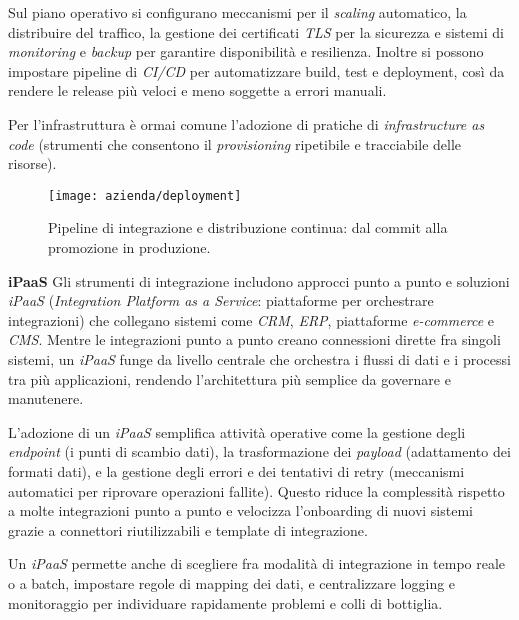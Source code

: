Sul piano operativo si configurano meccanismi per il \emph{scaling} automatico, la distribuire del traffico, 
la gestione dei certificati \emph{TLS} per la sicurezza e sistemi di \emph{monitoring} e \emph{backup} per garantire disponibilità e resilienza. 
Inoltre si possono impostare pipeline di \emph{CI/CD} per automatizzare build, test e deployment, così da rendere le release più veloci e meno soggette a errori manuali.

Per l’infrastruttura è ormai comune l’adozione di pratiche di \emph{infrastructure as code} (strumenti che consentono il \emph{provisioning} ripetibile e tracciabile delle risorse). 

\begin{figure}[htbp]
    \centering
    \texttt{[image: azienda/deployment]}
    \caption{Pipeline di integrazione e distribuzione continua: dal commit alla promozione in produzione.}
    \label{fig:deployment}
\end{figure}


\medskip
\noindent\textbf{iPaaS}
Gli strumenti di integrazione includono approcci punto a punto e soluzioni \emph{iPaaS} (\emph{Integration Platform as a Service}: piattaforme per orchestrare integrazioni) 
che collegano sistemi come \emph{CRM}, \emph{ERP}, piattaforme \emph{e-commerce} e \emph{CMS}. Mentre le integrazioni punto a punto creano connessioni dirette fra singoli sistemi, 
un \emph{iPaaS} funge da livello centrale che orchestra i flussi di dati e i processi tra più applicazioni, rendendo l’architettura più semplice da governare e manutenere.

L’adozione di un \emph{iPaaS} semplifica attività operative come la gestione degli \emph{endpoint} (i punti di scambio dati), la trasformazione dei \emph{payload} 
(adattamento dei formati dati), e la gestione degli errori e dei tentativi di retry (meccanismi automatici per riprovare operazioni fallite). 
Questo riduce la complessità rispetto a molte integrazioni punto a punto e velocizza l’onboarding di nuovi sistemi grazie a connettori riutilizzabili e template di integrazione.

Un \emph{iPaaS} permette anche di scegliere fra modalità di integrazione 
in tempo reale o a batch, impostare regole di mapping dei dati, e centralizzare logging e monitoraggio per individuare rapidamente problemi e colli di bottiglia.

